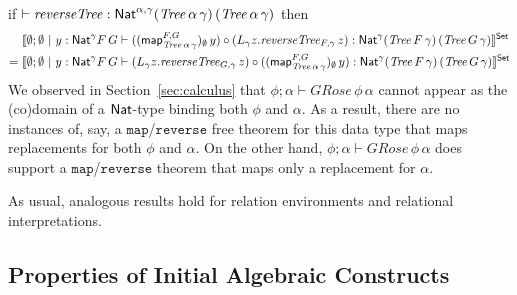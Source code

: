 \documentclass{lmcs}
\theoremstyle{plain}\newtheorem{satz}[thm]{Satz}
\newcommand{\map}{\mathsf{map}}
\begin{document}
if $\vdash \mathit{reverseTree} : \mathsf{Nat}^{\alpha, \gamma} (\mathit{Tree}
\,\alpha \, \gamma) \, (\mathit{Tree} \, \alpha \, \gamma)$ then
\begin{align*}
  &\setsem{\emptyset; \emptyset~|~y : \Nat^\gamma F \, G 
  \vdash  ((\map_{\mathit{Tree}\,\alpha \, \gamma}^{F,
      G})_\emptyset\, y) \circ (L_{{\gamma}} z. \mathit{reverseTree}_{F,
      \gamma}\, z) : \Nat^{{\gamma}} 
    (\mathit{Tree} \, F \, \gamma) \, (\mathit{Tree} \, G \,
    \gamma) }\\ =\; &\setsem{\emptyset; \emptyset~|~y :
    \Nat^\gamma F \, G \vdash (L_{\gamma}
    z. \mathit{reverseTree}_{G, \gamma}\,z) \circ
    ((\map_{\mathit{Tree} \, \alpha\, \gamma}^{{F},
      {G}})_\emptyset\, y) : \Nat^{\gamma} (\mathit{Tree} \,
    F \, \gamma) \, (\mathit{Tree} \, G\, \gamma)}
\end{align*}
\noindent
We observed in Section~\ref{sec:calculus} that $ \phi; \alpha \vdash
\mathit{GRose}\,\phi\,\alpha$ cannot appear as the (co)domain of a
$\mathsf{Nat}$-type binding both $\phi$ and $\alpha$. As a result, there are
no instances of, say, a $\mathtt{map}$/$\mathtt{reverse}$ free theorem
for this data type that maps replacements for both $\phi$ and
$\alpha$. On the other hand, $\phi; \alpha \vdash
\mathit{GRose}\,\phi\,\alpha$ does support a
$\mathtt{map}$/$\mathtt{reverse}$ theorem that maps only a replacement
for $\alpha$.

As usual, analogous results hold for relation environments and
relational interpretations.

\subsection{Properties of Initial Algebraic Constructs}\label{sec:iaps}
\end{document}
